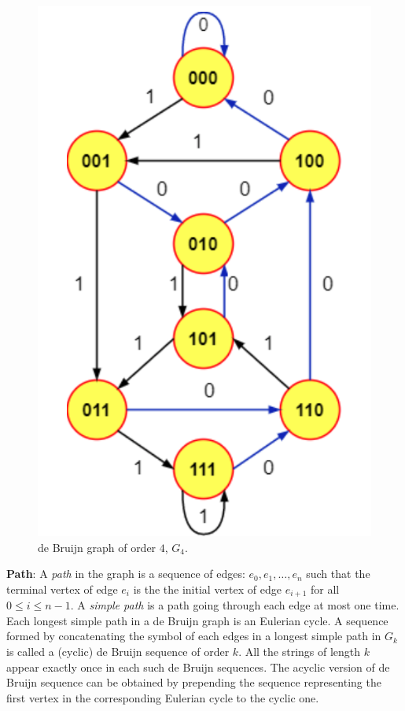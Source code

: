 \begin{figure}[htbp]
    \centering
    \includegraphics[scale=.3]{fig/dB4.png}
    \caption{de Bruijn graph of order $4$, $G_{4}$.}
    \label{fig:dB4}
\end{figure}

\textbf{Path}: A \textit{path} in the graph is a sequence of edges: $e_{0},e_{1},\ldots,e_{n}$ such that the terminal vertex of edge $e_{i}$ is the the initial vertex of edge $e_{i+1}$ for all $0\leq i\leq n-1$. A \textit{simple path} is a path going through each edge at most one time. Each longest simple path in a de Bruijn graph is an Eulerian cycle. A sequence formed by concatenating the symbol of each edges in a longest simple path in $G_{k}$ is called a (cyclic) de Bruijn sequence of order $k$. All the strings of length $k$ appear exactly once in each such de Bruijn sequences. The acyclic version of de Bruijn sequence can be obtained by prepending the sequence representing the first vertex in the corresponding Eulerian cycle to the cyclic one. 

